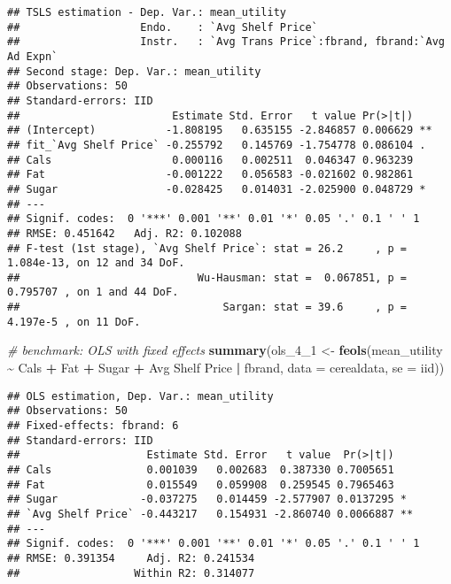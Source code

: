 \documentclass[
]{article}
\newenvironment{Shaded}{\begin{snugshade}}{\end{snugshade}}
\newcommand{\AttributeTok}[1]{\textcolor[rgb]{0.13,0.29,0.53}{#1}}
\newcommand{\CommentTok}[1]{\textcolor[rgb]{0.56,0.35,0.01}{\textit{#1}}}
\newcommand{\FunctionTok}[1]{\textcolor[rgb]{0.13,0.29,0.53}{\textbf{#1}}}
\newcommand{\NormalTok}[1]{#1}
\newcommand{\OtherTok}[1]{\textcolor[rgb]{0.56,0.35,0.01}{#1}}
\newcommand{\SpecialCharTok}[1]{\textcolor[rgb]{0.81,0.36,0.00}{\textbf{#1}}}
\newcommand{\StringTok}[1]{\textcolor[rgb]{0.31,0.60,0.02}{#1}}
\begin{document}
\begin{verbatim}
## TSLS estimation - Dep. Var.: mean_utility
##                   Endo.    : `Avg Shelf Price`
##                   Instr.   : `Avg Trans Price`:fbrand, fbrand:`Avg Ad Expn`
## Second stage: Dep. Var.: mean_utility
## Observations: 50
## Standard-errors: IID 
##                        Estimate Std. Error   t value Pr(>|t|)    
## (Intercept)           -1.808195   0.635155 -2.846857 0.006629 ** 
## fit_`Avg Shelf Price` -0.255792   0.145769 -1.754778 0.086104 .  
## Cals                   0.000116   0.002511  0.046347 0.963239    
## Fat                   -0.001222   0.056583 -0.021602 0.982861    
## Sugar                 -0.028425   0.014031 -2.025900 0.048729 *  
## ---
## Signif. codes:  0 '***' 0.001 '**' 0.01 '*' 0.05 '.' 0.1 ' ' 1
## RMSE: 0.451642   Adj. R2: 0.102088
## F-test (1st stage), `Avg Shelf Price`: stat = 26.2     , p = 1.084e-13, on 12 and 34 DoF.
##                            Wu-Hausman: stat =  0.067851, p = 0.795707 , on 1 and 44 DoF.
##                                Sargan: stat = 39.6     , p = 4.197e-5 , on 11 DoF.
\end{verbatim}

\begin{Shaded}
\begin{Highlighting}[]
\CommentTok{\#  benchmark: OLS with fixed effects}
\FunctionTok{summary}\NormalTok{(ols\_4\_1 }\OtherTok{\textless{}{-}} \FunctionTok{feols}\NormalTok{(mean\_utility }\SpecialCharTok{\textasciitilde{}}\NormalTok{ Cals }\SpecialCharTok{+}\NormalTok{ Fat }\SpecialCharTok{+}\NormalTok{ Sugar }\SpecialCharTok{+} \StringTok{\textasciigrave{}}\AttributeTok{Avg Shelf Price}\StringTok{\textasciigrave{}} \SpecialCharTok{|}\NormalTok{ fbrand, }\AttributeTok{data =}\NormalTok{ cerealdata,}
                     \AttributeTok{se =} \StringTok{\textquotesingle{}iid\textquotesingle{}}\NormalTok{))}
\end{Highlighting}
\end{Shaded}

\begin{verbatim}
## OLS estimation, Dep. Var.: mean_utility
## Observations: 50
## Fixed-effects: fbrand: 6
## Standard-errors: IID 
##                    Estimate Std. Error   t value  Pr(>|t|)    
## Cals               0.001039   0.002683  0.387330 0.7005651    
## Fat                0.015549   0.059908  0.259545 0.7965463    
## Sugar             -0.037275   0.014459 -2.577907 0.0137295 *  
## `Avg Shelf Price` -0.443217   0.154931 -2.860740 0.0066887 ** 
## ---
## Signif. codes:  0 '***' 0.001 '**' 0.01 '*' 0.05 '.' 0.1 ' ' 1
## RMSE: 0.391354     Adj. R2: 0.241534
##                  Within R2: 0.314077
\end{verbatim}
\end{document}
